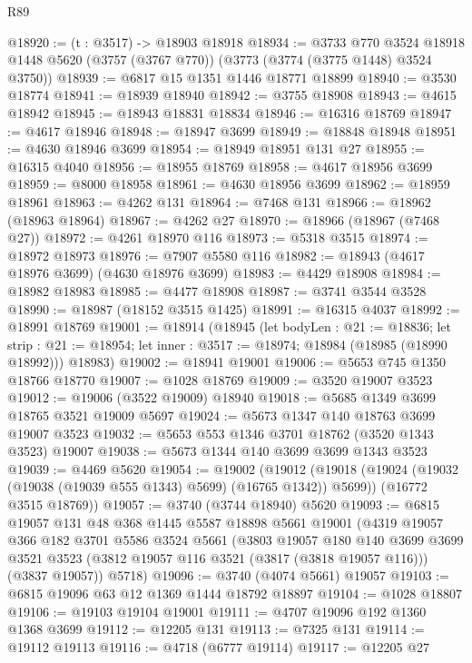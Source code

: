 \begin{lexlean}{R89}
\begin{coremodule}
@18920 := (t : @3517) -> @18903 @18918
@18934 := @3733
    @770
    @3524
    @18918
    @1448
    @5620
    (@3757 (@3767 @770))
    (@3773 (@3774 (@3775 @1448) @3524 @3750))
@18939 := @6817 @15 @1351 @1446 @18771 @18899
@18940 := @3530 @18774
@18941 := @18939 @18940
@18942 := @3755 @18908
@18943 := @4615 @18942
@18945 := @18943 @18831 @18834
@18946 := @16316 @18769
@18947 := @4617 @18946
@18948 := @18947 @3699
@18949 := @18848 @18948
@18951 := @4630 @18946 @3699
@18954 := @18949 @18951 @131 @27
@18955 := @16315 @4040
@18956 := @18955 @18769
@18958 := @4617 @18956 @3699
@18959 := @8000 @18958
@18961 := @4630 @18956 @3699
@18962 := @18959 @18961
@18963 := @4262 @131
@18964 := @7468 @131
@18966 := @18962 (@18963 @18964)
@18967 := @4262 @27
@18970 := @18966 (@18967 (@7468 @27))
@18972 := @4261 @18970 @116
@18973 := @5318 @3515
@18974 := @18972 @18973
@18976 := @7907 @5580 @116
@18982 := @18943 (@4617 @18976 @3699) (@4630 @18976 @3699)
@18983 := @4429 @18908
@18984 := @18982 @18983
@18985 := @4477 @18908
@18987 := @3741 @3544 @3528
@18990 := @18987 (@18152 @3515 @1425)
@18991 := @16315 @4037
@18992 := @18991 @18769
@19001 := @18914
    (@18945
      (let bodyLen : @21 := @18836;
      let strip : @21 := @18954; let inner : @3517 := @18974; @18984 (@18985 (@18990 @18992)))
      @18983)
@19002 := @18941 @19001
@19006 := @5653 @745 @1350 @18766 @18770
@19007 := @1028 @18769
@19009 := @3520 @19007 @3523
@19012 := @19006 (@3522 @19009) @18940
@19018 := @5685 @1349 @3699 @18765 @3521 @19009 @5697
@19024 := @5673 @1347 @140 @18763 @3699 @19007 @3523
@19032 := @5653 @553 @1346 @3701 @18762 (@3520 @1343 @3523) @19007
@19038 := @5673 @1344 @140 @3699 @3699 @1343 @3523
@19039 := @4469 @5620
@19054 := @19002
    (@19012
      (@19018 (@19024 (@19032 (@19038 (@19039 @555 @1343) @5699) (@16765 @1342)) @5699))
      (@16772 @3515 @18769))
@19057 := @3740 (@3744 @18940) @5620
@19093 := @6815
    @19057
    @131
    @48
    @368
    @1445
    @5587
    @18898
    @5661
    @19001
    (@4319
      @19057
      @366
      @182
      @3701
      @5586
      @3524
      @5661
      (@3803
        @19057
        @180
        @140
        @3699
        @3699
        @3521
        @3523
        (@3812 @19057 @116 @3521 (@3817 (@3818 @19057 @116)))
        (@3837 @19057))
      @5718)
@19096 := @3740 (@4074 @5661) @19057
@19103 := @6815 @19096 @63 @12 @1369 @1444 @18792 @18897
@19104 := @1028 @18807
@19106 := @19103 @19104 @19001
@19111 := @4707 @19096 @192 @1360 @1368 @3699
@19112 := @12205 @131
@19113 := @7325 @131
@19114 := @19112 @19113
@19116 := @4718 (@6777 @19114)
@19117 := @12205 @27

\end{coremodule}
\end{lexlean}
